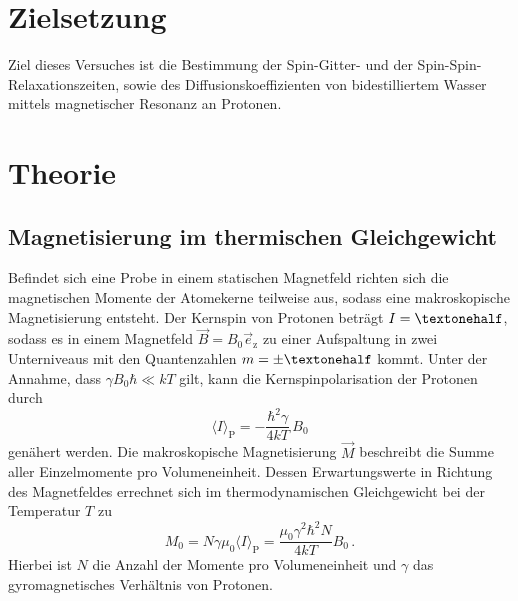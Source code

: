 \section{Zielsetzung}
Ziel dieses Versuches ist die Bestimmung der Spin-Gitter- und der Spin-Spin-Relaxationszeiten, sowie des Diffusionskoeffizienten von bidestilliertem Wasser mittels magnetischer Resonanz an Protonen.

\section{Theorie}
\subsection{Magnetisierung im thermischen Gleichgewicht}
Befindet sich eine Probe in einem statischen Magnetfeld richten sich die magnetischen Momente der Atomekerne teilweise aus, sodass eine makroskopische Magnetisierung entsteht.
Der Kernspin von Protonen beträgt $I=\textonehalf$, sodass es in einem Magnetfeld $\vec{B}=B_0\vec{e}_\text{z}$ zu einer Aufspaltung in zwei Unterniveaus mit den Quantenzahlen $m=\pm \textonehalf$ kommt.
Unter der Annahme, dass $\gamma B_0 \hbar \ll kT$ gilt, kann die Kernspinpolarisation der Protonen durch
\begin{equation}
    \langle I \rangle_\text{P} = -\frac{\hbar^2\gamma}{4kT}\,B_0
\end{equation}
genähert werden.
Die makroskopische Magnetisierung $\vec{M}$ beschreibt die Summe aller Einzelmomente pro Volumeneinheit.
Dessen Erwartungswerte in Richtung des Magnetfeldes errechnet sich im thermodynamischen Gleichgewicht bei der Temperatur $T$ zu 
\begin{equation}
    M_0=N\gamma \mu_0 \langle I \rangle_\text{P} = \frac{\mu_0\gamma^2\hbar^2N}{4kT}B_0\, .
\end{equation}
Hierbei ist $N$ die Anzahl der Momente pro Volumeneinheit und $\gamma$ das  gyromagnetisches Verhältnis von Protonen.

